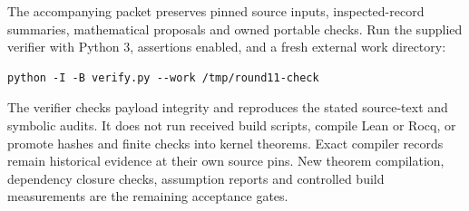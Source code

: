 \documentclass[11pt]{article}
\begin{document}
The accompanying packet preserves pinned source inputs, inspected-record summaries, mathematical proposals and owned portable checks. Run the supplied verifier with Python 3, assertions enabled, and a fresh external work directory:
\begin{verbatim}
python -I -B verify.py --work /tmp/round11-check
\end{verbatim}
The verifier checks payload integrity and reproduces the stated source-text and symbolic audits. It does not run received build scripts, compile Lean or Rocq, or promote hashes and finite checks into kernel theorems. Exact compiler records remain historical evidence at their own source pins. New theorem compilation, dependency closure checks, assumption reports and controlled build measurements are the remaining acceptance gates.
\end{document}
